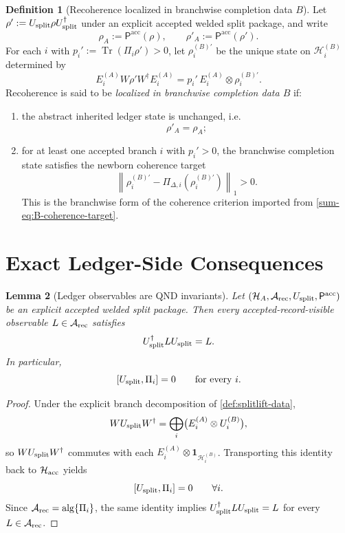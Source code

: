 \documentclass[11pt]{article}
\theoremstyle{definition}
\newtheorem{definition}{Definition}[section]
\theoremstyle{plain}
\newtheorem{lemma}[definition]{Lemma}
\theoremstyle{remark}
\newcommand{\Arec}{\mathcal A_{\rm rec}}
\newcommand{\Hacc}{\mathcal H_{\rm acc}}
\newcommand{\HA}{\mathcal H_A}
\newcommand{\Pacc}{\mathsf P^{\mathrm{acc}}}
\newcommand{\Tr}{\operatorname{Tr}}
\newcommand{\1}{\mathbf 1}
\newcommand{\norm}[1]{\left\lVert #1 \right\rVert}
\begin{document}
\begin{definition}[Recoherence localized in branchwise completion data \(B\)]
\label{def:splitlift-recoherence}
Let \(\rho' := U_{\rm split}\rho U_{\rm split}^\dagger\) under an explicit accepted welded split
package, and write
\[
\rho_A:=\Pacc(\rho),
\qquad
\rho'_A:=\Pacc(\rho').
\]
For each \(i\) with \(p_i':=\Tr(\Pi_i\rho')>0\), let \(\rho_i^{(B)\prime}\) be the unique state on
\(\mathcal H_i^{(B)}\) determined by
\[
E_i^{(A)}W\rho'W^\dagger E_i^{(A)}
=
p_i' \, E_i^{(A)}\otimes \rho_i^{(B)\prime}.
\]
Recoherence is said to be \emph{localized in branchwise completion data \(B\)} if:
\begin{enumerate}[leftmargin=2em]
\item the abstract inherited ledger state is unchanged, i.e.
  \[
  \rho'_A=\rho_A;
  \]
\item for at least one accepted branch \(i\) with \(p_i'>0\), the branchwise completion state
  satisfies the newborn coherence target
  \[
  \norm{\rho_i^{(B)\prime}-\Pi_{\Delta,i}(\rho_i^{(B)\prime})}_1>0.
  \]
  This is the branchwise form of the coherence criterion imported from
  \eqref{sum-eq:B-coherence-target}.
\end{enumerate}
\end{definition}

\section{Exact Ledger-Side Consequences}
\label{sec:splitlift-lemmas}

\begin{lemma}[Ledger observables are QND invariants]
\label{lem:splitlift-qnd}
Let \((\HA,\Arec,U_{\rm split},\Pacc)\) be an explicit accepted welded split package.
Then every accepted-record-visible observable \(L\in\Arec\) satisfies
\[
U_{\rm split}^\dagger L U_{\rm split}
=
L.
\]
In particular,
\[
[U_{\rm split},\Pi_i]=0
\qquad
\text{for every } i.
\]
\end{lemma}

\begin{proof}
Under the explicit branch decomposition of \cref{def:splitlift-data},
\[
WU_{\rm split}W^\dagger
=
\bigoplus_i \bigl(E_i^{(A)}\otimes U_i^{(B)}\bigr),
\]
so \(WU_{\rm split}W^\dagger\) commutes with each \(E_i^{(A)}\otimes \1_{\mathcal H_i^{(B)}}\).
Transporting this identity back to \(\Hacc\) yields
\[
[U_{\rm split},\Pi_i]=0
\qquad
\forall i.
\]
Since \(\Arec=\mathrm{alg}\{\Pi_i\}\), the same identity implies
\(
U_{\rm split}^\dagger L U_{\rm split}=L
\)
for every \(L\in\Arec\).
\end{proof}
\end{document}
